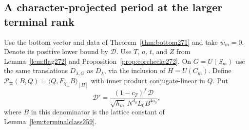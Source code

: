 \documentclass[a4paper,11pt]{article}
\theoremstyle{definition}
\theoremstyle{remark}
\numberwithin{equation}{section}
\begin{document}
\subsection{A character-projected period at the larger terminal rank}\label{nav:VIII-44}
Use the bottom vector and data of Theorem~\ref{thm:bottom271}
and take \(w_m=0\). Denote its positive lower bound by \(\mathcal D\).
Use \(T\), \(a\), \(t\), and \(Z\) from Lemma~\ref{lem:flag272}
and Proposition~\ref{prop:corehecke272}. On \(G=U(S_m)\) use
the same translations \(D_{\lambda,G}\) as \(D_\lambda\), via the
inclusion of \(H=U(C_m)\). Define
\(\mathcal P_\varpi(B,Q)=\langle Q,F_{\chi_\varpi}B\rangle_{[H]}\)
with inner product conjugate-linear in \(Q\). Put
\[
             \mathcal D'=
       \frac{(1-c_T)^f\,\mathcal D}
            {\sqrt{h_m}\,N^{d_0}L_0 B^{4a_0}} ,
\]
where \(B\) in this denominator is the lattice constant of
Lemma~\ref{lem:terminalclass259}.
\end{document}
